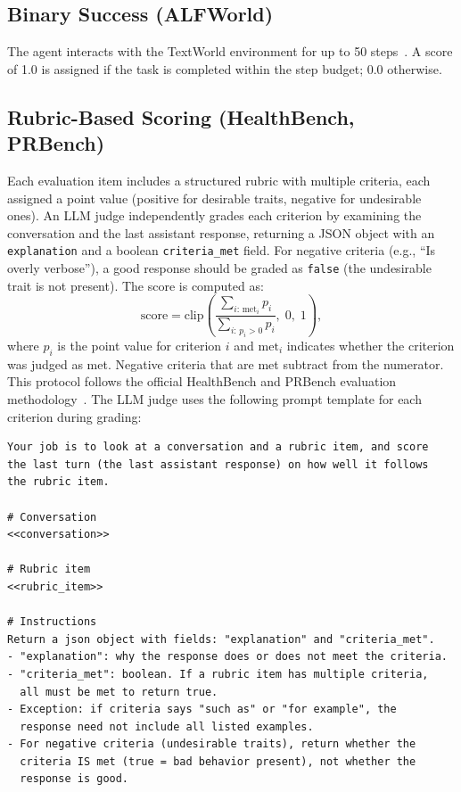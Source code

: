 \subsection{Binary Success (ALFWorld)}
\label{app:metric-binary-success}

The agent interacts with the TextWorld environment for up to 50 steps~\citep{textworld,alfworld}.
A score of 1.0 is assigned if the task is completed within the step budget; 0.0 otherwise.

\subsection{Rubric-Based Scoring (HealthBench, PRBench)}
\label{app:metric-rubric}

Each evaluation item includes a structured rubric with multiple criteria, each assigned a point value (positive for desirable traits, negative for undesirable ones).
An LLM judge independently grades each criterion by examining the conversation and the last assistant response, returning a JSON object with an \texttt{explanation} and a boolean \texttt{criteria\_met} field.
For negative criteria (e.g., ``Is overly verbose''), a good response should be graded as \texttt{false} (the undesirable trait is not present).
The score is computed as:
\begin{equation}
\text{score} = \text{clip}\!\left(\frac{\sum_{i:\, \text{met}_i} p_i}{\sum_{i:\, p_i > 0} p_i},\; 0,\; 1\right),
\end{equation}
where $p_i$ is the point value for criterion $i$ and $\text{met}_i$ indicates whether the criterion was judged as met.
Negative criteria that are met subtract from the numerator.
This protocol follows the official HealthBench and PRBench evaluation methodology~\citep{healthbench,prbench}.
The LLM judge uses the following prompt template for each criterion during grading:

\begin{lstlisting}[style=evolvedcode, basicstyle=\ttfamily\scriptsize]
Your job is to look at a conversation and a rubric item, and score
the last turn (the last assistant response) on how well it follows
the rubric item.

# Conversation
<<conversation>>

# Rubric item
<<rubric_item>>

# Instructions
Return a json object with fields: "explanation" and "criteria_met".
- "explanation": why the response does or does not meet the criteria.
- "criteria_met": boolean. If a rubric item has multiple criteria,
  all must be met to return true.
- Exception: if criteria says "such as" or "for example", the
  response need not include all listed examples.
- For negative criteria (undesirable traits), return whether the
  criteria IS met (true = bad behavior present), not whether the
  response is good.
\end{lstlisting}


